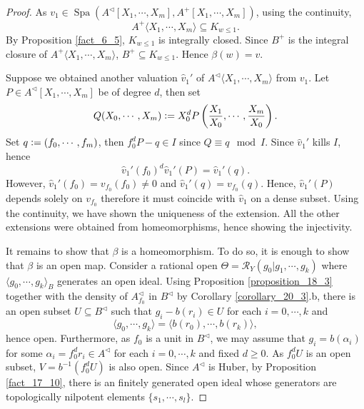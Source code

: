 \documentclass[8pt]{article}
\numberwithin{equation}{section}
\DeclareMathOperator{\Spa}{Spa}
\newcommand{\defeq}{\vcentcolon=}
\newcommand{\cR}[0]{\mathcal{R}}
\begin{document}
\begin{proof}
As $v_1\in\Spa(A^\triangleleft[X_1,\cdots,X_m],A^+[X_1,\cdots,X_m])$, using the continuity, 
\begin{equation*}
    A^+\langle X_1,\cdots,X_m\rangle\subseteq K_{w\leq 1}.
\end{equation*}
By Proposition \ref{fact_6_5}, $K_{w\leq 1}$ is integrally closed. Since $B^+$ is the integral closure of $A^+\langle X_1,\cdots,X_m\rangle$, $B^+\subseteq K_{w\leq 1}$. Hence $\beta(w) = v$.
\par Suppose we obtained another valuation $\widehat{v}_1'$ of $A^\triangleleft\langle X_1,\cdots,X_m\rangle$ from $v_1$.
Let $P\in A^\triangleleft[X_1,\cdots,X_m]$ be of degree $d$, then set 
\begin{equation*}
    Q(X_0,\cdots,X_m) \defeq X_0^dP\left({\frac {X_1} {X_0}},\cdots,{\frac {X_m} {X_0}}\right).
\end{equation*}
Set $q\defeq (f_0,\cdots,f_m)$, then $f_0^dP - q\in I$ since $Q \equiv q \mod{I}$. Since $\widehat{v}_1'$ kills $I$, hence 
\begin{equation*}
    \widehat{v}_1'(f_0)^d\widehat{v}_1'(P) = \widehat{v}_1'(q).
\end{equation*}
However, $\widehat{v}_1'(f_0) = v_{f_0}(f_0)\not=0$ and $\widehat{v}_1'(q) = v_{f_0}(q)$. Hence, $\widehat{v}_1'(P)$ depends solely on $v_{f_0}$ therefore it must coincide with $\widehat{v}_1$ on a dense subset. Using the continuity, we have shown the uniqueness of the extension.
All the other extensions were obtained from homeomorphisms, hence showing the injectivity.
\par It remains to show that $\beta$ is a homeomorphism. To do so, it is enough to show that $\beta$ is an open map. Consider a rational open $\Theta=\cR_Y(g_0|g_1,\cdots,g_k)$ where $\langle g_0,\cdots,g_k\rangle_B$ generates an open ideal.
Using Proposition \ref{proposition_18_3} together with the density of $A_{f_0}^\triangleleft$ in $B^\triangleleft$ by Corollary \ref{corollary_20_3}.b, there is an open subset $U\subseteq B^\triangleleft$ such that $g_i-b(r_i)\in U$ for each $i=0,\cdots,k$ and 
\begin{equation*}
\langle g_0,\cdots,g_k\rangle = \langle b(r_0),\cdots,b(r_k)\rangle,
\end{equation*}
hence open. Furthermore, as $f_0$ is a unit in $B^\triangleleft$, we may assume that $g_i = b(\alpha_i)$ for some $\alpha_i = f_0^dr_i\in A^\triangleleft$ for each $i=0,\cdots,k$ and fixed $d\geq0$. As $f^d_0U$ is an open subset, $V=b^{-1}(f_0^dU)$ is also open. Since $A^\triangleleft$ is Huber, by Proposition \ref{fact_17_10}, there is an finitely generated open ideal whose generators are topologically nilpotent elements $\{s_1,\cdots,s_l\}$. 

\end{proof}
\end{document}
